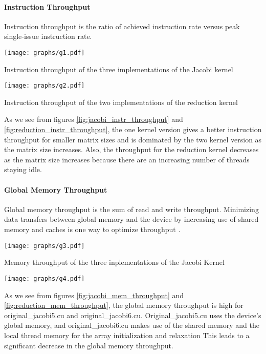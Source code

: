 \documentclass[10pt]{article}
\makeatletter
\newenvironment{figurehere}
{\def\@captype{figure}}
{}
\makeatother
\begin{document}
\begin{multicols}{2}
  \paragraph{Instruction Throughput}
  Instruction throughput is the ratio of achieved instruction rate versus peak single-issue instruction rate.

  \begin{figurehere}
    \centering
    \texttt{[image: graphs/g1.pdf]}
    \caption{Instruction throughput of the three implementations of the Jacobi kernel}
    \label{fig:jacobi_instr_throughput}
  \end{figurehere}

  \begin{figurehere}
    \centering
    \texttt{[image: graphs/g2.pdf]}
    \caption{Instruction throughput of the two implementations of the reduction kernel}
    \label{fig:reduction_instr_throughput}
  \end{figurehere}

  As we see from figures \ref{fig:jacobi_instr_throughput} and \ref{fig:reduction_instr_throughput}, the one kernel version gives a better instruction throughput for smaller matrix sizes and is dominated by the two kernel version as the matrix size increases.
  Also, the throughput for the reduction kernel decreases as the  matrix size increases because there are an increasing number of threads staying idle. 

  \paragraph{Global Memory Throughput}
  Global memory throughput is the sum of read and write throughput.
  Minimizing data transfers between global memory and the device by increasing use of shared memory and caches is one way to optimize throughput \cite{bib:nvidia}.

  \begin{figurehere}
    \centering
    \texttt{[image: graphs/g3.pdf]}
    \caption{Memory throughput of the three inplementations of the Jacobi Kernel}
    \label{fig:jacobi_mem_throughput}
  \end{figurehere}

  \begin{figurehere}
    \centering
    \texttt{[image: graphs/g4.pdf]}
    \caption{}
    \label{fig:reduction_mem_throughput}
  \end{figurehere}
  As we see from figures \ref{fig:jacobi_mem_throughput} and \ref{fig:reduction_mem_throughput}, the global memory throughput is high for original\_jacobi5.cu and original\_jacobi6.cu.
  Original\_jacobi5.cu uses the device's global memory, and original\_jacobi6.cu makes use of the shared memory and the local thread memory for the array initialization and relaxation 
  This leads to a significant decrease in the global memory throughput.


\end{multicols}
\end{document}
